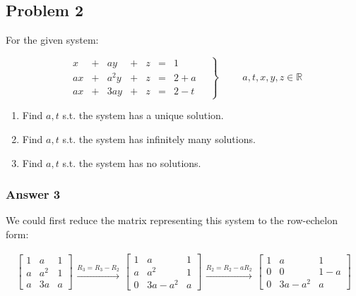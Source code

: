 \documentclass[11pt]{article}
\begin{document}
\subsection{Problem 2}
\label{sec:orgheadline7}

For the given system:

\begin{equation*}
  \left.
    \begin{alignedat}{4}
      & x  & {}+{} & ay   & {}+{} & z & {}={} & 1 \\
      & ax & {}+{} & a^2y & {}+{} & z & {}={} & 2+a \\
      & ax & {}+{} & 3ay  & {}+{} & z & {}={} & 2-t
    \end{alignedat}
    \quad \right\} \qquad
  \begin{aligned}
    a,t,x,y,z \in \mathbb{R}
  \end{aligned}
\end{equation*}

\begin{enumerate}
\item Find \(a, t\) s.t. the system has a unique solution.
\item Find \(a, t\) s.t. the system has infinitely many solutions.
\item Find \(a, t\) s.t. the system has no solutions.
\end{enumerate}

\subsubsection{Answer 3}
\label{sec:orgheadline4}
We could first reduce the matrix representing this system to the row-echelon
form:

\begin{align*}
  \begin{bmatrix}
    1 & a   & 1 \\
    a & a^2 & 1 \\
    a & 3a  & a
  \end{bmatrix}
  \begin{aligned} \xrightarrow{R_3 = R_3 - R_2} \end{aligned}
  \begin{bmatrix}
    1 & a      & 1 \\
    a & a^2    & 1 \\
    0 & 3a-a^2 & a
  \end{bmatrix}
  \begin{aligned} \xrightarrow{R_2 = R_2 - aR_2} \end{aligned}
  \begin{bmatrix}
    1 & a      & 1 \\
    0 & 0      & 1-a \\
    0 & 3a-a^2 & a
  \end{bmatrix}
\end{align*}
\end{document}
